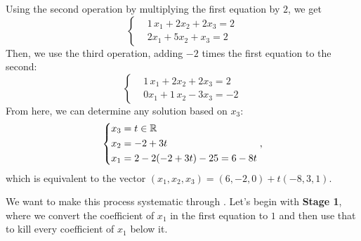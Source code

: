 \documentclass[main.tex]{subfiles}
\begin{document}
\begin{soln}
    Using the second operation by multiplying the first equation by $2$, we get
    \[\left\{\begin{aligned}
        &\boxed{1}\,x_1 + 2x_2 + 2x_3 = 2 \\
        &2x_1 + 5x_2 + x_3 = 2
    \end{aligned}\right.\]
    Then, we use the third operation, adding $-2$ times the first equation to the second:
    \[\left\{\begin{aligned}
        &\boxed{1}\,x_1 + 2x_2 + 2x_3 = 2 \\
        &0x_1 + \boxed{1}\,x_2 - 3x_3 = -2
    \end{aligned}\right.\]
    From here, we can determine any solution based on $x_3$:
    \[\left\{\begin{aligned}
        x_3 &= t\in \mathbb R \\
        x_2 &= -2 + 3t \\
        x_1 &= 2 - 2(-2 + 3t) - 25 = 6 - 8t
    \end{aligned}\right.,\]
    which is equivalent to the vector $(x_1, x_2, x_3) = \boxed{(6, -2, 0) + t(-8, 3, 1)}$.
\end{soln}

We want to make this process systematic through . Let's begin with \textbf{Stage 1}, where we convert the coefficient of $x_1$ in the first equation to $1$ and then use that to kill every coefficient of $x_1$ below it.
\end{document}
